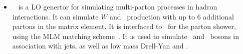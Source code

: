 \begin{itemize}
    \item \alpgen~\cite{alpgen} is a LO genertor for simulating multi-parton
    processes in hadron interactions. It can simulate $W$ and \Z\ production
    with up to 6 additional partons in the matrix element. It is interfaced to
    \herwig\ for the parton shower, using the MLM matching
    scheme~\cite{Mangano2002343}. It is used to simulate \W\ and \Z\ bosons in
    association with jets, as well as low mass Drell-Yan and \Wg.



\end{itemize}


